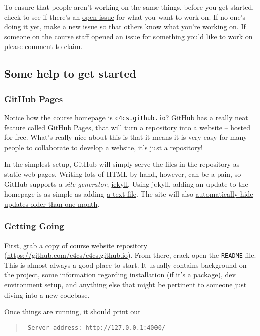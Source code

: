 \documentclass{article}
\begin{document}
To ensure that people aren't working on the same things, before you get
started, check to see if there's an
\href{https://github.com/c4cs/c4cs.github.io/issues}{open issue} for what you
want to work on. If no one's doing it yet, make a new issue so that others
know what you're working on. If someone on the course staff opened an issue for
something you'd like to work on please comment to claim.

\subsection*{Some help to get started}

\subsubsection*{GitHub Pages}

Notice how the course homepage is \texttt{c4cs.\ul{github.io}}? GitHub has a
really neat feature called \href{https://pages.github.com/}{GitHub Pages},
that will turn a repository into a website -- hosted for free.
What's really nice about this is that it means it is very easy for many
people to collaborate to develop a website, it's just a repository!

In the simplest setup, GitHub will simply serve the files in the repository as
static web pages. Writing lots of HTML by hand, however, can be a pain, so
GitHub supports a \emph{site generator}, \href{https://jekyllrb.com/}{jekyll}.
Using jekyll, adding an update to the homepage is as simple as adding
\href{https://github.com/c4cs/c4cs.github.io/blob/master/_updates/f16/2016-10-11-chaos.md}{a text file}.
The site will also
\href{https://github.com/c4cs/c4cs.github.io/blob/master/index.html#L32}%
{automatically hide updates older than one month}.

\subsubsection*{Getting Going}

First, grab a copy of course website repository
(\url{https://github.com/c4cs/c4cs.github.io}). From there, crack open the
\texttt{README} file. This is almost always a good place to start. It usually
contains background on the project, some information regarding installation (if
it's a package), dev environment setup, and anything else that might be
pertinent to someone just diving into a new codebase.

Once things are running, it should print out
\begin{quote}\tt
  Server address: http://127.0.0.1:4000/
\end{quote}
\end{document}
